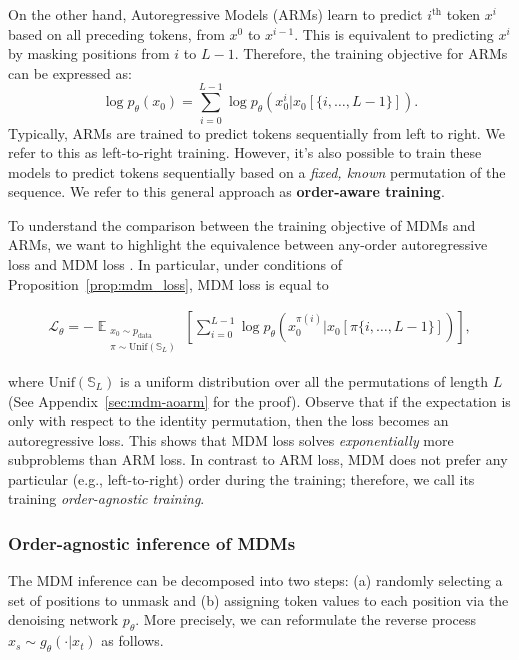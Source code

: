 \documentclass{article}
\newcommand{\E}{\mathbb{E}}
\theoremstyle{plain}
\theoremstyle{definition}
\theoremstyle{remark}
\begin{document}
On the other hand, Autoregressive Models (ARMs) learn to predict $i^{\textrm{th}}$ token $x^i$ based on all preceding tokens, from $x^0$ to $x^{i-1}$. This is equivalent to predicting $x^i$ by masking positions from $i$ to $L-1$. Therefore, the training objective for ARMs can be expressed as:
\begin{equation} \label{eqn:ar_loss}
    \log p_\theta(x_0) = \sum_{i=0}^{L-1} \log p_\theta ( x_0^i | x_0 [\{i,\ldots,L-1\}]).
\end{equation}
Typically, ARMs are trained to predict tokens sequentially from left to right. We refer to this as left-to-right training. However, it's also possible to train these models to predict tokens sequentially based on a \emph{fixed, known} permutation of the sequence. We refer to this general approach as \textbf{order-aware training}.

To understand the comparison between the training objective of MDMs and ARMs, we want to highlight the equivalence between any-order autoregressive loss and MDM loss \cite{hoogeboom2022autoregressive, ou2024absorbing}. In particular, under conditions of Proposition~\ref{prop:mdm_loss}, MDM loss is equal to 

{\small
\begin{align*}
    \mathcal{L}_\theta =- \mathop{\E}_{\substack{ x_0 \sim p_{\textrm{data}} \\ \pi \sim \textrm{Unif}(\mathbb S_L) }} \left[\sum_{i=0}^{L-1} \log p_\theta \left( x_0^{\pi(i)} \Big| x_0 [\pi\{i,\ldots,L-1\}] \right) \right],
\end{align*}}

where $\textrm{Unif}(\mathbb S_L)$ is a uniform distribution over all the permutations of length $L$ (See Appendix~\ref{sec:mdm-aoarm} for the proof). Observe that if the expectation is only with respect to the identity permutation, then the loss becomes an autoregressive loss. This shows that MDM loss solves \emph{exponentially} more subproblems than ARM loss. In contrast to ARM loss, MDM does not prefer any particular (e.g., left-to-right) order during the training; therefore, we call its training \emph{order-agnostic training}. 


\subsubsection{Order-agnostic inference of MDMs}
\label{sec:vanilla-mdm-inference}

The MDM inference can be decomposed into two steps: (a) randomly selecting a set of positions to unmask and (b) assigning token values to each position via the denoising network $p_\theta$. More precisely, we can reformulate the reverse process $x_s \sim g_\theta(\cdot | x_t)$ as follows. 
\end{document}
